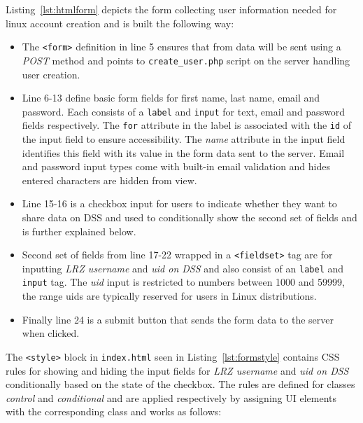 Listing~\ref{lst:htmlform} depicts the form collecting user information needed
for linux account creation and is built the following way:

\begin{itemize}
    \item The \texttt{<form>} definition in line 5 ensures that from data will
    be sent using a \textit{POST} method and points to \texttt{create\_user.php}
    script on the server handling user creation.
    \item Line 6-13 define basic form fields for first name, last name, email
    and password. Each consists of a \texttt{label} and \texttt{input} for text,
    email and password fields respectively. The \texttt{for} attribute in the
    label is associated with the \texttt{id} of the input field to ensure
    accessibility. The \textit{name} attribute in the input field identifies
    this field with its value in the form data sent to the server. Email and
    password input types come with built-in email validation and hides entered
    characters are hidden from view.
    \item Line 15-16 is a checkbox input for users to indicate whether they want
    to share data on DSS and used to conditionally show the second set of
    fields and is further explained below.
    \item Second set of fields from line 17-22 wrapped in a \texttt{<fieldset>}
    tag are for inputting \textit{LRZ username} and \textit{uid on DSS} and also
    consist of an \texttt{label} and \texttt{input} tag. The \textit{uid} input
    is restricted to numbers between 1000 and 59999, the range uids are
    typically reserved for users in Linux distributions.
    \item Finally line 24 is a submit button that sends the form data to the
    server when clicked.
\end{itemize}



The \texttt{<style>} block in \texttt{index.html} seen in
Listing~\ref{lst:formstyle} contains CSS rules for showing and hiding the input
fields for \textit{LRZ username} and \textit{uid on DSS} conditionally based on
the state of the checkbox. The rules are defined for classes \textit{control}
and \textit{conditional} and are applied respectively by assigning UI elements
with the corresponding class and works as follows:

